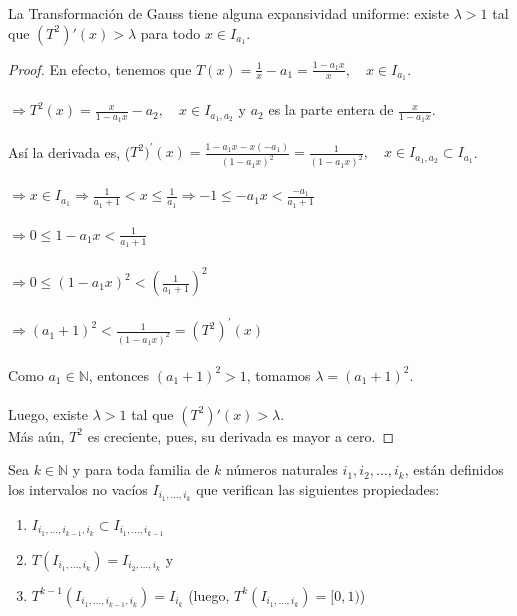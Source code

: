 \begin{prop}
La Transformación de Gauss tiene alguna expansividad uniforme: existe $\lambda>1$ tal que $(T^2)'(x)>\lambda$ para todo $x\in I_{a_{1}}$.
\end{prop}
\begin{proof}
En efecto, tenemos que $T(x)=\frac{1}{x} - a_{1}=\frac{1-a_{1}x}{x},\quad x\in I_{a_{1}}$.
\\
\\
$\Rightarrow T^{2}(x)=\frac{x}{1-a_{1}x}-a_{2},\quad x\in I_{a_{1},a_{2}}$ y $a_{2}$ es la parte entera de $\frac{x}{1-a_{1}x}$.
\\
\\
Así la derivada es, ($T^{2})^{\prime}(x)=\frac{1-a_{1}x-x(-a_{1})}{(1-a_{1}x)^2}=\frac{1}{(1-a_{1}x)^{2}},\quad x\in I_{a_{1},a_{2}}\subset I_{a_{1}}$.
\\
\\
$\Rightarrow x\in I_{a_{1}} \Rightarrow\frac{1}{a_{1}+1} <  x \leq \frac{1}{a_{1}} \Rightarrow -1 \leq -a_{1}x < \frac{-a_{1}}{a_{1}+1}$\\
\\
$\Rightarrow 0 \leq 1-a_{1}x < \frac{1}{a_{1}+1}$
\\
\\
$\Rightarrow 0 \leq (1-a_{1}x)^{2} < (\frac{1}{a_{1}+1})^{2}$
\\
\\
$\Rightarrow ({a_{1}+1})^{2}< \frac{1}{(1-a_{1}x)^{2}}=(T^{2})^{\prime}(x)$
\\
\\
Como $a_{1}\in\mathbb{N}$, entonces $({a_{1}+1})^{2}>1$, tomamos $\lambda=({a_{1}+1})^{2}$.
\\
\\
Luego, existe $\lambda>1$ tal que $(T^2)'(x)>\lambda$.
\\
Más aún, $T^{2}$ es creciente, pues, su derivada es mayor a cero. 
\end{proof}

\begin{prop}
Sea $k\in\mathbb{N}$ y para toda familia de $k$ números naturales $i_{1},i_{2},\ldots,i_{k}$, están definidos los intervalos no vacíos $I_{i_{1},\ldots,i_{k}}$ que verifican las siguientes propiedades:
\begin{enumerate}
    \item $I_{i_{1},\ldots,i_{k-1},i_{k}}\subset I_{i_{1},\ldots,i_{k-1}}$
    \item $T(I_{i_{1},\ldots,i_{k}})=I_{i_{2},\ldots,i_{k}}$ y
    \item $T^{k-1}(I_{i_{1},\ldots,i_{k-1},i_{k}})=I_{i_{k}}$ (luego, $T^{k}(I_{i_{1},\ldots,i_{k}})=[0,1)$)
\end{enumerate}
\label{PropInterval}
\end{prop} 

